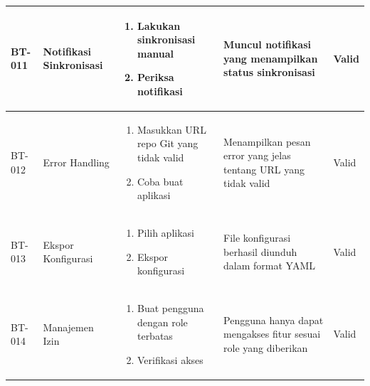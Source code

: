 \begin{table}[H]
\begin{adjustbox}{width=\textwidth}
\begin{tabular}{|p{0.8cm}|p{2.2cm}|p{4cm}|p{3.5cm}|p{1.2cm}|}
      BT-011            & Notifikasi Sinkronisasi & \begin{enumerate}[leftmargin=*,noitemsep,topsep=0pt,label=\arabic*.,widest=99]
                                                      \item Lakukan sinkronisasi manual
                                                      \item Periksa notifikasi
                                                    \end{enumerate}        & Muncul notifikasi yang menampilkan status sinkronisasi              & Valid                                                            \\ \hline
      BT-012            & Error Handling          & \begin{enumerate}[leftmargin=*,noitemsep,topsep=0pt,label=\arabic*.,widest=99]
                                                      \item Masukkan URL repo Git yang tidak valid
                                                      \item Coba buat aplikasi
                                                    \end{enumerate}        & Menampilkan pesan error yang jelas tentang URL yang tidak valid     & Valid                                                            \\ \hline
      BT-013            & Ekspor Konfigurasi      & \begin{enumerate}[leftmargin=*,noitemsep,topsep=0pt,label=\arabic*.,widest=99]
                                                      \item Pilih aplikasi
                                                      \item Ekspor konfigurasi
                                                    \end{enumerate}        & File konfigurasi berhasil diunduh dalam format YAML                 & Valid                                                            \\ \hline
      BT-014            & Manajemen Izin          & \begin{enumerate}[leftmargin=*,noitemsep,topsep=0pt,label=\arabic*.,widest=99]
                                                      \item Buat pengguna dengan role terbatas
                                                      \item Verifikasi akses
                                                    \end{enumerate}        & Pengguna hanya dapat mengakses fitur sesuai role yang diberikan     & Valid                                                            \\ \hline

\end{tabular}
\end{adjustbox}
\end{table}
